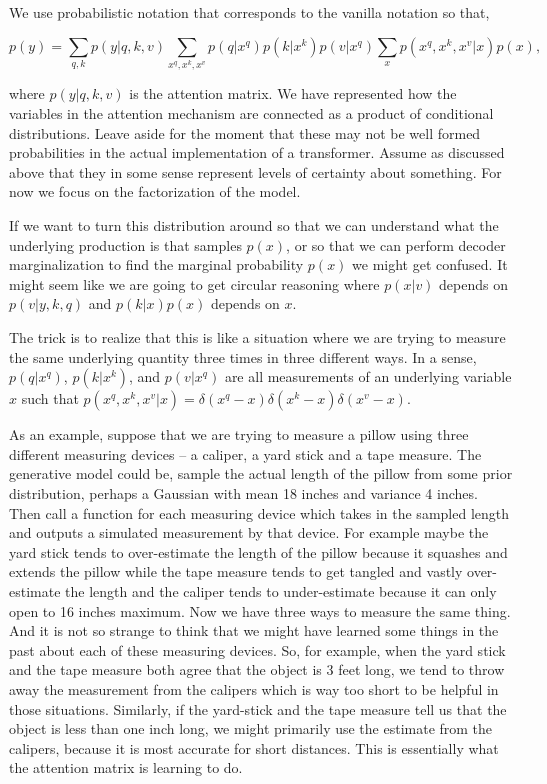 \documentclass{article}
\begin{document}
We use probabilistic notation that corresponds to the vanilla notation so that,

\begin{equation}\label{eq-appendix:encoder-attention}
    p(y) =
    \sum_{q,k}p(y|q,k,v)
    \sum_{x^q, x^k, x^v} p(q|x^q)p(k|x^k)p(v|x^q)
    \sum_x p(x^q, x^k, x^v|x)p(x),
\end{equation}

where $p(y|q,k, v)$ is the attention matrix.  We have represented how the variables in the attention mechanism are connected as a product of conditional distributions.  Leave aside for the moment that these may not be well formed probabilities in the actual implementation of a transformer. Assume as discussed above that they in some sense represent levels of certainty about something.  For now we focus on the factorization of the model.

If we want to turn this distribution around so that we can understand what the underlying production is that samples $p(x)$, or so that we can perform decoder marginalization to find the marginal probability $p(x)$ we might get confused. It might seem like we are going to get circular reasoning where $p(x|v)$ depends on $p(v|y, k, q)$ and $p(k|x)p(x)$ depends on $x$.

The trick is to realize that this is like a situation where we are trying to measure the same underlying quantity three times in three different ways.  In a sense, $p(q|x^q)$, $p(k|x^k)$, and $p(v|x^q)$ are all measurements of an underlying variable $x$ such that $p(x^q, x^k, x^v|x) = \delta(x^q-x)\delta(x^k-x)\delta(x^v-x)$. 

As an example, suppose that we are trying to measure a pillow using three different measuring devices -- a caliper, a yard stick and a tape measure.  The generative model could be, sample the actual length of the pillow from some prior distribution, perhaps a Gaussian with mean 18 inches and variance 4 inches.  Then call a function for each measuring device which takes in the sampled length and outputs a simulated measurement by that device.  For example maybe the yard stick tends to over-estimate the length of the pillow because it squashes and extends the pillow while the tape measure tends to get tangled and vastly over-estimate the length and the caliper tends to under-estimate because it can only open to 16 inches maximum.  Now we have three ways to measure the same thing.  And it is not so strange to think that we might have learned some things in the past about each of these measuring devices.  So, for example, when the yard stick and the tape measure both agree that the object is 3 feet long, we tend to throw away the measurement from the calipers which is way too short to be helpful in those situations.  Similarly, if the yard-stick and the tape measure tell us that the object is less than one inch long, we might primarily use the estimate from the calipers, because it is most accurate for short distances.  This is essentially what the attention matrix is learning to do. 
\end{document}
